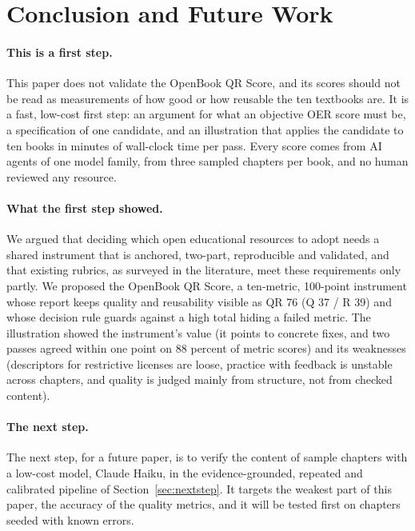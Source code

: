 \section{Conclusion and Future Work}
\label{sec:conclusion}

\paragraph{This is a first step.}
This paper does not validate the OpenBook QR Score, and its scores should not be read as measurements of how good or how reusable the ten textbooks are. It is a fast, low-cost first step: an argument for what an objective OER score must be, a specification of one candidate, and an illustration that applies the candidate to ten books in minutes of wall-clock time per pass. Every score comes from AI agents of one model family, from three sampled chapters per book, and no human reviewed any resource.

\paragraph{What the first step showed.}
We argued that deciding which open educational resources to adopt needs a shared instrument that is anchored, two-part, reproducible and validated, and that existing rubrics, as surveyed in the literature, meet these requirements only partly. We proposed the OpenBook QR Score, a ten-metric, 100-point instrument whose report keeps quality and reusability visible as QR 76 (Q 37 / R 39) and whose decision rule guards against a high total hiding a failed metric. The illustration showed the instrument's value (it points to concrete fixes, and two passes agreed within one point on 88 percent of metric scores) and its weaknesses (descriptors for restrictive licenses are loose, practice with feedback is unstable across chapters, and quality is judged mainly from structure, not from checked content).

\paragraph{The next step.}
The next step, for a future paper, is to verify the content of sample chapters with a low-cost model, Claude Haiku, in the evidence-grounded, repeated and calibrated pipeline of Section~\ref{sec:nextstep}. It targets the weakest part of this paper, the accuracy of the quality metrics, and it will be tested first on chapters seeded with known errors.


